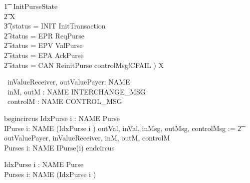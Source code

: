 \documentclass{article}
\begin{document}
\begin{circusaction}
    \t1 \circspot\ \lschexpract InitPurseState \rschexpract \circseq \\
    	 \t2 \circmu X \circspot\ \\
		\t3 (\lcircguard status = INIT \rcircguard \circguard  InitTransaction  \\
	\t2 \extchoice \lcircguard status = EPR \rcircguard \circguard  ReqPurse  \\
	\t2 \extchoice \lcircguard status = EPV \rcircguard \circguard  ValPurse  \\
	\t2 \extchoice \lcircguard status = EPA \rcircguard \circguard  AckPurse  \\
	\t2 \extchoice \lcircguard status = CAN \rcircguard \circguard \lschexpract ReinitPurse \rschexpract \circseq controlMsg!CFAIL \then \Skip) \circseq X \\	
\end{circusaction}

\begin{circus}
    \circend
\end{circus}

\begin{circus}
     \circchannel\ inValueReceiver, outValuePayer: NAME \cross \nat \\
     \circchannel\ inM, outM : NAME \cross INTERCHANGE\_MSG \\
     \circchannel\ controlM : NAME \cross CONTROL\_MSG 
\end{circus}

begin{circus}
      \circprocess IdxPurse \circdef i : NAME \circindex Purse \\
      \circprocess IPurse     \circdef i: NAME \circspot (IdxPurse \lcircindex i \rcircindex) 
	\lcircrename outVal, inVal, inMsg, outMsg, controlMsg := 
		\t2 outValuePayer, inValueReceiver, inM, outM, controlM \rcircrename \\      
      \circprocess Purses \circdef \Interleave i: NAME \circspot IPurse(i)
end{circus}

\begin{circus}
      \circprocess IdxPurse \circdef i : NAME \circindex Purse 
\\      
      \circprocess Purses \circdef \Interleave i: NAME \circspot (IdxPurse \lcircindex i \rcircindex)
\end{circus}
\end{document}
